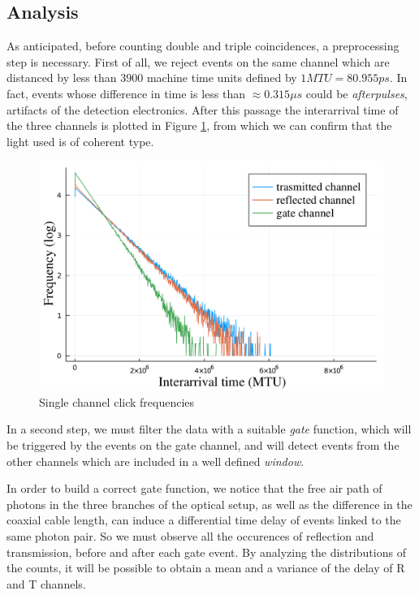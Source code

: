\documentclass[10pt, final]{article}
\begin{document}
\begin{multicols}{2}
\subsection*{Analysis}
As anticipated, before counting double and triple coincidences, a preprocessing step is necessary. First of all, we reject events on the same channel which are distanced by less than $3900$ machine time units defined by $1 MTU = 80.955 ps$. In fact, events whose difference in time is less than $\approx 0.315 \mu s$ could be \emph{afterpulses}, artifacts of the detection electronics. After this passage the interarrival time of the three channels is plotted in Figure \ref{exps}, from which we can confirm that the light used is of coherent type.
\begin{mdframed}
    \begin{figure}[H]
        \centering
        \includegraphics[width = \textwidth]{../images/single_chan.pdf}
        \caption{Single channel click frequencies}
        \label{exps}
    \end{figure}
\end{mdframed}

In a second step, we must filter the data with a suitable \emph{gate} function, which will be triggered by the events on the gate channel, and will detect events from the other channels which are included in a well defined \emph{window}. 

In order to build a correct gate function, we notice that the free air path of photons in the three branches of the optical setup, as well as the difference in the coaxial cable length, can induce a differential time delay of events linked to the same photon pair. So we must observe all the occurences of reflection and transmission, before and after each gate event. By analyzing the distributions of the counts, it will be possible to obtain a mean and a variance of the delay of R and T channels.


\end{multicols}
\end{document}
